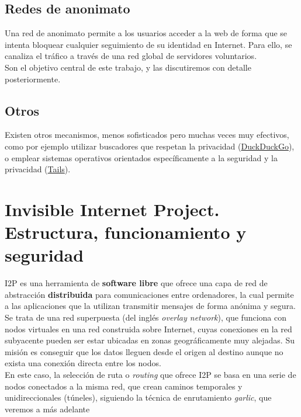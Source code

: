 \subsection{Redes de anonimato} 

Una red de anonimato permite a los usuarios acceder a la web de forma que se intenta bloquear cualquier seguimiento de su identidad en Internet. Para ello, se canaliza el tráfico a través de una red global de servidores voluntarios.\\

Son el objetivo central de este trabajo, y las discutiremos con detalle posteriormente.

\subsection{Otros} Existen otros mecanismos, menos sofisticados pero muchas veces muy efectivos, como por ejemplo utilizar buscadores que respetan la privacidad (\href{https://duckduckgo.com/}{\url{DuckDuckGo}}), o emplear sistemas operativos orientados específicamente a la seguridad y la privacidad (\href{https://tails.boum.org/}{\url{Tails}}).




    \section{Invisible Internet Project. Estructura, funcionamiento y seguridad}

I2P es una herramienta de \textbf{software libre} que ofrece una capa de red de abstracción  \textbf{distribuida} para comunicaciones entre ordenadores, la cual permite a las aplicaciones que la utilizan transmitir mensajes de forma anónima y segura. Se trata de una red superpuesta (del inglés \textit{overlay network}), que funciona con nodos virtuales en una red construida sobre Internet, cuyas conexiones en la red subyacente pueden ser estar ubicadas en zonas geográficamente muy alejadas. Su misión es conseguir que los datos lleguen desde el origen al destino aunque no exista una conexión directa entre los nodos.\\

En este caso, la selección de ruta o \textit{routing} que ofrece I2P se basa en una serie de nodos conectados a la misma red, que crean caminos temporales y unidireccionales (túneles), siguiendo la técnica de enrutamiento \textit{garlic}, que veremos a más adelante\\

